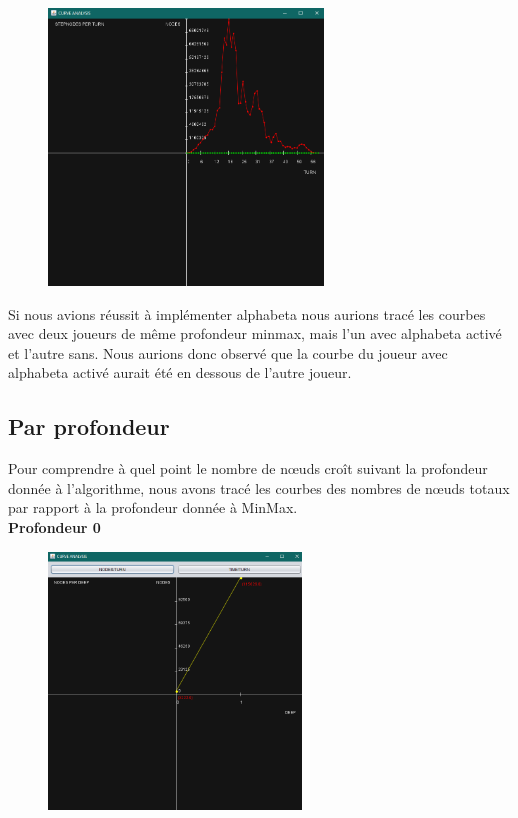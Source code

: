 \newpage

\begin{figure}[!ht]
\begin{center}
\includegraphics[width=0.65\textwidth]{./STEPNODESPERTURN4}
\end{center}
\end{figure}

Si nous avions réussit à implémenter alphabeta nous aurions tracé les courbes avec deux joueurs de même
profondeur minmax, mais l'un avec alphabeta activé et l'autre sans.
Nous aurions donc observé que la courbe du joueur avec alphabeta activé aurait été en dessous de l'autre
joueur.

\newpage

\subsection{Par profondeur}

Pour comprendre à quel point le nombre de nœuds croît suivant la profondeur donnée à l'algorithme,
nous avons tracé les courbes des nombres de nœuds totaux par rapport à la profondeur donnée à
MinMax. \\[0.75 cm]

 
\centering \textbf{Profondeur 0}
\begin{figure}[!ht]
\begin{center}
\includegraphics[width=0.60\textwidth]{./NODESPERDEEP1}
\end{center}
\end{figure}

